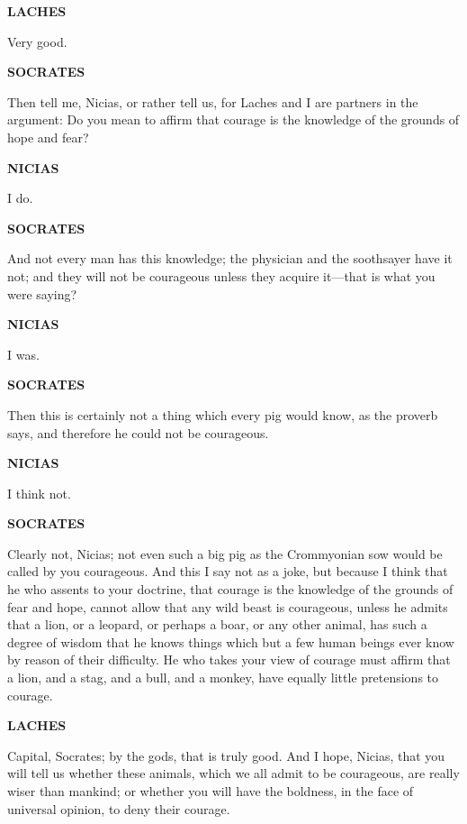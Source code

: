 \documentclass[11pt,letter]{book}
\begin{document}
\par \textbf{LACHES}
\par   Very good.

\par \textbf{SOCRATES}
\par   Then tell me, Nicias, or rather tell us, for Laches and I are partners in the argument:  Do you mean to affirm that courage is the knowledge of the grounds of hope and fear?

\par \textbf{NICIAS}
\par   I do.

\par \textbf{SOCRATES}
\par   And not every man has this knowledge; the physician and the soothsayer have it not; and they will not be courageous unless they acquire it—that is what you were saying?

\par \textbf{NICIAS}
\par   I was.

\par \textbf{SOCRATES}
\par   Then this is certainly not a thing which every pig would know, as the proverb says, and therefore he could not be courageous.

\par \textbf{NICIAS}
\par   I think not.

\par \textbf{SOCRATES}
\par   Clearly not, Nicias; not even such a big pig as the Crommyonian sow would be called by you courageous. And this I say not as a joke, but because I think that he who assents to your doctrine, that courage is the knowledge of the grounds of fear and hope, cannot allow that any wild beast is courageous, unless he admits that a lion, or a leopard, or perhaps a boar, or any other animal, has such a degree of wisdom that he knows things which but a few human beings ever know by reason of their difficulty. He who takes your view of courage must affirm that a lion, and a stag, and a bull, and a monkey, have equally little pretensions to courage.

\par \textbf{LACHES}
\par   Capital, Socrates; by the gods, that is truly good. And I hope, Nicias, that you will tell us whether these animals, which we all admit to be courageous, are really wiser than mankind; or whether you will have the boldness, in the face of universal opinion, to deny their courage.
\end{document}
